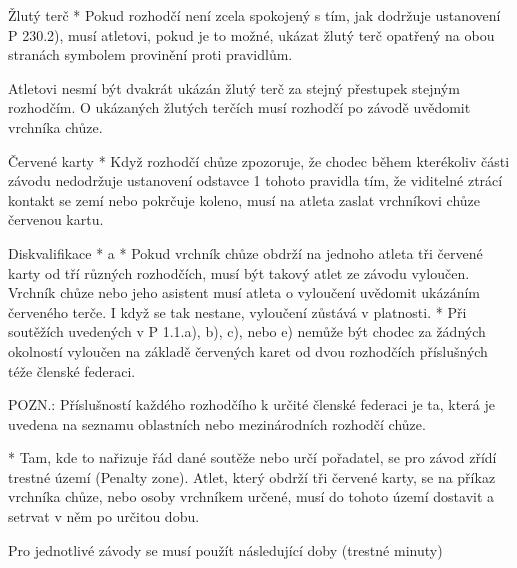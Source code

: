 Žlutý terč
* Pokud rozhodčí není zcela spokojený s tím, jak dodržuje ustanovení P 230.2), musí atletovi, pokud je to možné, ukázat žlutý terč opatřený na obou stranách symbolem provinění proti pravidlům.

Atletovi nesmí být dvakrát ukázán žlutý terč za stejný přestupek stejným rozhodčím. O ukázaných žlutých terčích musí rozhodčí po závodě uvědomit vrchníka chůze.

Červené karty
* Když rozhodčí chůze zpozoruje, že chodec během kterékoliv části závodu nedodržuje ustanovení odstavce 1 tohoto pravidla tím, že viditelné ztrácí kontakt se zemí nebo pokrčuje koleno, musí na atleta zaslat vrchníkovi chůze červenou kartu.

Diskvalifikace
* \begitems \style a
  * Pokud vrchník chůze obdrží na jednoho atleta tři červené karty od tří různých rozhodčích, musí být takový atlet ze závodu vyloučen. Vrchník chůze nebo jeho asistent musí atleta o vyloučení uvědomit ukázáním červeného terče. I když se tak nestane, vyloučení zůstává v platnosti.
  * Při soutěžích uvedených v P 1.1.a), b), c), nebo e) nemůže být chodec za žádných okolností vyloučen na základě červených karet od dvou rozhodčích příslušných téže členské federaci.

  POZN.: Příslušností každého rozhodčího k určité členské federaci je ta, která je uvedena na seznamu oblastních nebo mezinárodních rozhodčí chůze.

  * Tam, kde to nařizuje řád dané soutěže nebo určí pořadatel, se pro závod zřídí trestné území (Penalty zone). Atlet, který obdrží tři červené karty, se na příkaz vrchníka chůze, nebo osoby vrchníkem určené, musí do tohoto území dostavit a setrvat v něm po určitou dobu.

  Pro jednotlivé závody se musí použít následující doby (trestné minuty)


